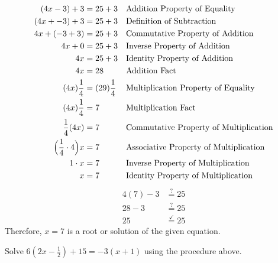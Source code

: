 \begin{align*}
(4x - 3)+ 3 &= 25 + 3  && \text{Addition Property of Equality}\\
(4x + -3) + 3 &= 25 + 3 && \text{Definition of Subtraction}\\
4x + (-3 + 3) &= 25 + 3 && \text{Commutative Property of Addition}\\
4x + 0 &= 25 + 3 && \text{Inverse Property of Addition}\\
4x &= 25 + 3 && \text{Identity Property of Addition}\\
4x &= 28 && \text{Addition Fact}\\
(4x)\frac{1}{4}&=(29) \frac{1}{4} && \text{Multiplication Property of Equality}\\
(4x)\frac{1}{4}&=7 && \text{Multiplication Fact}\\
\frac{1}{4}(4x)&=7 && \text{Commutative Property of Multiplication}\\
\Bigl( \frac{1}{4}\cdot 4\Bigr)x&=7 && \text{Associative Property of Multiplication}\\
1\cdot x&=7 && \text{Inverse Property of Multiplication}\\
x&=7 && \text{Identity Property of Multiplication}
\end{align*}
\CHECK
\begin{align*}
4 (7) - 3 &\overset{?}{=}25\\
28 - 3 &\overset{?}{=}25\\
25 & \overset{\checkmark}{=}25
\end{align*}
Therefore, $x=7$ is a root or solution of the given equation.
\begin{exercise}
\Item Solve $6(2x-\frac{1}{2})+15=-3(x+1)$ using the procedure above.

\end{exercise}
